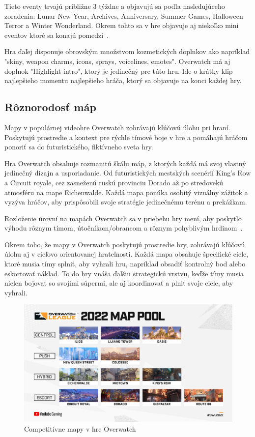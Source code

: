 \documentclass[10pt,oneside,slovak,a4paper]{article}
\begin{document}
Tieto eventy trvajú približne 3 týždne a objavujú sa poďla nasledujúceho
zoradenia: Lunar New Year, Archives, Anniversary, Summer Games, Halloween Terror a Winter Wonderland. Okrem tohto sa v hre objavuje aj niekoľko mini eventov ktoré sa konajú pomedzi~\cite{Overwatchbook}.



Hra ďaľej disponuje obrovským množstvom kozmetických doplnkov ako napríklad "skiny, weapon charms, icons, sprays, voicelines, emotes". Overwatch
má aj doplnok "Highlight intro", ktorý je jedinečný pre túto hru. Ide o krátky klip najlepšieho momentu najlepšieho hráča, ktorý sa objavuje na konci každej hry.




\subsection{Rôznorodosť máp} \label{Rôznorodosť máp}

Mapy v populárnej videohre Overwatch zohrávajú kľúčovú úlohu pri hraní. Poskytujú prostredie a kontext pre rýchle tímové boje v hre a pomáhajú hráčom ponoriť sa do futuristického, fiktívneho sveta hry.

Hra Overwatch obsahuje rozmanitú škálu máp, z ktorých každá má svoj vlastný jedinečný dizajn a usporiadanie. Od futuristických mestských scenérií King's Row a Circuit royale, cez zasneženú ruskú provinciu Dorado až po stredovekú atmosféru na mape Eichenwalde. Každá mapa ponúka osobitý vizuálny zážitok a vyzýva hráčov, aby prispôsobili svoje stratégie jedinečnému terénu a prekážkam.

Rozloženie úrovní na mapách Overwatch sa v priebehu hry mení, aby poskytlo výhodu rôznym tímom, útočníkom/obrancom a rôznym pohyblivým hrdinom~\cite{Overwatchmaps}.

Okrem toho, že mapy v Overwatch poskytujú prostredie hry, zohrávajú kľúčovú úlohu aj v cieľovo orientovanej hrateľnosti. Každá mapa obsahuje špecifické ciele, ktoré musia tímy splniť, aby vyhrali hru, napríklad obsadiť kontrolný bod alebo eskortovať náklad. To do hry vnáša ďalšiu strategickú vrstvu, keďže tímy musia nielen bojovať so svojimi súpermi, ale aj koordinovať a plniť svoje ciele, aby vyhrali.

\begin{figure}[h!]
\includegraphics[scale=0.165]{images/overwatch_maps.png}
\caption{Competitívne mapy v hre Overwatch}
\end{figure}
\end{document}
